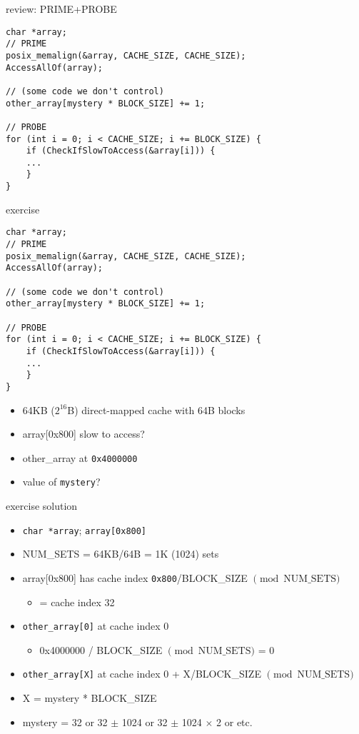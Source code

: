 
\begin{frame}[fragile]{review: PRIME+PROBE}
\begin{Verbatim}[fontsize=\small]
char *array;
// PRIME
posix_memalign(&array, CACHE_SIZE, CACHE_SIZE);
AccessAllOf(array);

// (some code we don't control)
other_array[mystery * BLOCK_SIZE] += 1;

// PROBE
for (int i = 0; i < CACHE_SIZE; i += BLOCK_SIZE) {
    if (CheckIfSlowToAccess(&array[i])) {
    ...
    }
}
\end{Verbatim}
\end{frame}

\begin{frame}[fragile]{exercise}
\begin{Verbatim}[fontsize=\small]
char *array;
// PRIME
posix_memalign(&array, CACHE_SIZE, CACHE_SIZE);
AccessAllOf(array);

// (some code we don't control)
other_array[mystery * BLOCK_SIZE] += 1;

// PROBE
for (int i = 0; i < CACHE_SIZE; i += BLOCK_SIZE) {
    if (CheckIfSlowToAccess(&array[i])) {
    ...
    }
}
\end{Verbatim}
\begin{itemize}
\item 64KB ($2^{16}$B) direct-mapped cache with 64B blocks
\item array[0x800] slow to access?
\item other\_array at \texttt{0x4000000}
\item value of \texttt{mystery}?
\end{itemize}
\end{frame}

\begin{frame}[fragile]{exercise solution}
\begin{itemize}
\item \texttt{char *array}; \texttt{array[0x800]}
\item NUM\_SETS = 64KB/64B = 1K (1024) sets
\item array[0x800] has cache index \texttt{0x800}/BLOCK\_SIZE $\pmod{\text{NUM\_SETS}}$
    \begin{itemize}
    \item = cache index 32
    \end{itemize}
\item \texttt{other\_array[0]} at cache index 0
    \begin{itemize}
    \item 0x4000000 / BLOCK\_SIZE $\pmod{\text{NUM\_SETS}}$ = 0
    \end{itemize}
\item \texttt{other\_array[X]} at cache index 0 + X/BLOCK\_SIZE $\pmod{\text{NUM\_SETS}}$
\item X = mystery * BLOCK\_SIZE
\item mystery = 32 or 32 $\pm$ 1024 or 32 $\pm$ 1024 $\times$ 2 or etc.
\end{itemize}
\end{frame}

